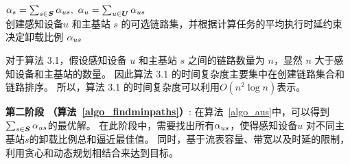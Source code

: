 \begin{algorithm}[!t]
\setstretch{\algostretch}
${\alpha}_{s} = \sum_{s \in \boldsymbol{S}}{\alpha}_{us}, \  {\alpha}_{u} = \sum_{u \in \boldsymbol{U}}{\alpha}_{us}$\\
\caption{创建感知设备$u$ 和主基站 $s$ 的可选链路集，并根据计算任务的平均执行时延约束决定卸载比例 ${\alpha}_{us}$}
\label{algo_aus}
\end{algorithm}

对于算法 3.1，假设感知设备 $u$ 和主基站 $s$ 之间的链路数量为 $n$，显然 $n$ 大于感知设备和主基站的数量。
因此算法 3.1 的时间复杂度主要集中在创建链路集合和链路排序。
所以，算法 3.1 的时间复杂度可以利用$O(n^2\log{n})$表示。

\textbf{第二阶段 （算法~\ref{algo_findminpaths}）}:
在算法~\ref{algo_aus}中，可以得到$\sum_{s \in \boldsymbol{S}}{\alpha}_{us}$的最优解。
在此阶段中，需要找出所有${\alpha}_{us}$，使得感知设备$u$ 对不同主基站$s$的卸载比例总和逼近最佳值。
同时，基于流表容量、带宽以及时延的限制，利用贪心和动态规划相结合来达到目标。

